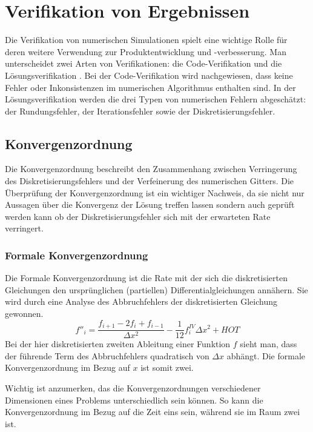 \section{Verifikation von Ergebnissen}
\label{sec:verifik_allg}

Die Verifikation von numerischen Simulationen spielt eine wichtige Rolle
für deren weitere Verwendung zur Produktentwicklung und -verbesserung.
Man unterscheidet zwei Arten von Verifikationen: die Code-Verifikation und die Lösungsverifikation
\cite{veluri}.
Bei der Code-Verifikation wird nachgewiesen, dass keine Fehler oder Inkonsistenzen im numerischen
Algorithmus enthalten sind. In der Lösungsverifikation werden die drei Typen von numerischen Fehlern
abgeschätzt: der Rundungsfehler, der Iterationsfehler sowie der Diskretisierungsfehler.

\subsection{Konvergenzordnung}

Die Konvergenzordnung beschreibt den Zusammenhang zwischen Verringerung des Diskretisierungsfehlers
und der Verfeinerung des numerischen Gitters.
Die Überprüfung der Konvergenzordnung ist ein wichtiger Nachweis, da sie nicht nur Aussagen über
die Konvergenz der Lösung treffen lassen sondern auch geprüft werden kann ob der Diskretisierungsfehler
sich mit der erwarteten Rate verringert.

\subsubsection{Formale Konvergenzordnung}

Die Formale Konvergenzordnung ist die Rate mit der sich die diskretisierten Gleichungen
den ursprünglichen (partiellen) Differentialgleichungen annähern.
Sie wird durch eine Analyse des Abbruchfehlers
der diskretisierten Gleichung gewonnen.
\begin{equation}
  f''_i = \frac{f_{i+1}-2f_i +f_{i-1}}{\Delta x^2} -\frac{1}{12} f^{IV}_i \Delta x^2 + HOT
\end{equation}
Bei der hier diskretisierten zweiten Ableitung einer Funktion $f$ sieht man, dass der führende
Term des Abbruchfehlers quadratisch von $\Delta x$ abhängt. Die formale Konvergenzordnung im Bezug
auf $x$ ist somit zwei.

Wichtig ist anzumerken, das die Konvergenzordnungen verschiedener Dimensionen
eines Problems unterschiedlich sein können. So kann die Konvergenzordnung im Bezug auf die Zeit eins sein,
während sie im Raum zwei ist.


